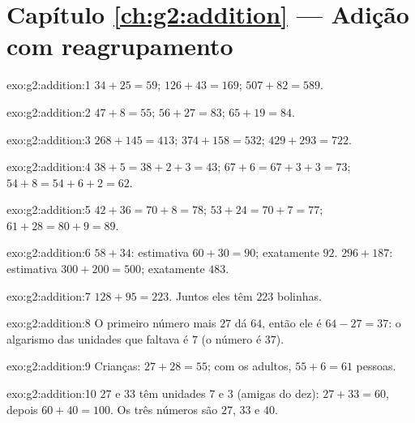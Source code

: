 \section*{Capítulo \ref{ch:g2:addition} --- Adição com reagrupamento}

\begin{solution}{exo:g2:addition:1}
$34 + 25 = 59$; \quad $126 + 43 = 169$; \quad $507 + 82 = 589$.
\end{solution}

\begin{solution}{exo:g2:addition:2}
$47 + 8 = 55$; \quad $56 + 27 = 83$; \quad $65 + 19 = 84$.
\end{solution}

\begin{solution}{exo:g2:addition:3}
$268 + 145 = 413$; \quad $374 + 158 = 532$; \quad
$429 + 293 = 722$.
\end{solution}

\begin{solution}{exo:g2:addition:4}
$38 + 5 = 38 + 2 + 3 = 43$; \quad $67 + 6 = 67 + 3 + 3 = 73$; \quad
$54 + 8 = 54 + 6 + 2 = 62$.
\end{solution}

\begin{solution}{exo:g2:addition:5}
$42 + 36 = 70 + 8 = 78$; \quad $53 + 24 = 70 + 7 = 77$; \quad
$61 + 28 = 80 + 9 = 89$.
\end{solution}

\begin{solution}{exo:g2:addition:6}
$58 + 34$: estimativa $60 + 30 = 90$; exatamente $92$.
$296 + 187$: estimativa $300 + 200 = 500$; exatamente $483$.
\end{solution}

\begin{solution}{exo:g2:addition:7}
$128 + 95 = 223$. Juntos eles têm $223$ bolinhas.
\end{solution}

\begin{solution}{exo:g2:addition:8}
O primeiro número mais $27$ dá $64$, então ele é $64 - 27 = 37$: o
algarismo das unidades que faltava é $7$ (o número é $37$).
\end{solution}

\begin{solution}{exo:g2:addition:9}
Crianças: $27 + 28 = 55$; com os adultos, $55 + 6 = 61$ pessoas.
\end{solution}

\begin{solution}{exo:g2:addition:10}
$27$ e $33$ têm unidades $7$ e $3$ (amigas do dez):
$27 + 33 = 60$, depois $60 + 40 = 100$. Os três números são $27$,
$33$ e $40$.
\end{solution}
